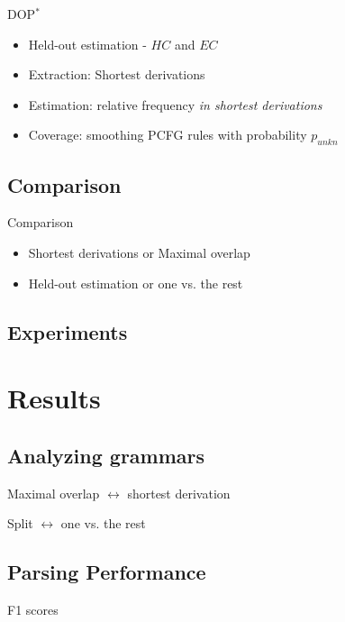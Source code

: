 \documentclass{beamer}
\newcommand{\dops}[0]{DOP$ ^*$}
\begin{document}
\begin{frame}{\dops{}}
\begin{itemize}
\item Held-out estimation - $HC$ and $EC$
\item Extraction: Shortest derivations
\item Estimation: relative frequency \emph{in shortest derivations}
\item Coverage: smoothing PCFG rules with probability $p_{unkn}$
\end{itemize}
\end{frame}

\subsection{Comparison}
\begin{frame}{Comparison}
\begin{itemize}
\item Shortest derivations or Maximal overlap
\item Held-out estimation or one vs. the rest
\end{itemize}
\end{frame}

\subsection{Experiments}


\section{Results}

\subsection{Analyzing grammars}

\begin{frame}{Maximal overlap $\leftrightarrow$ shortest derivation}
\end{frame}

\begin{frame}{Split $\leftrightarrow$ one vs. the rest}
\end{frame}

\subsection{Parsing Performance}
\begin{frame}{F1 scores}
\end{frame}
\end{document}
